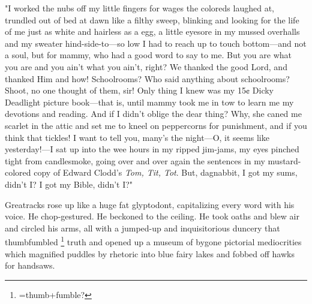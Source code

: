   "I worked the nubs 
off my little fingers for wages the coloreds laughed at, trundled 
out of bed at dawn like a filthy sweep, blinking and looking for the
life of me just as white and hairless as a egg, a little eyesore in my mussed
overhalls and my sweater hind-side-to---so low I had to reach up to touch
bottom---and not a soul, but for mammy, who had a good word to say to me. But you
are what you are and you ain't what you ain't, right? We thanked the good Lord,
and thanked Him and how! Schoolrooms? Who said anything about schoolrooms?
Shoot, no one thought of them, sir! Only thing I knew was my 15¢ Dicky Deadlight
picture book---that is, until mammy took me in tow to learn me my devotions and
reading. And if I didn't oblige the dear thing? Why, she caned me scarlet in the
attic and set me to kneel on peppercorns for punishment, and if you think that
tickles! 
I want to tell you, many's the night---O, it seems like yesterday!---I sat
up into the wee hours in my ripped jim-jams, 
my eyes pinched tight from
candlesmoke, going over and over again the sentences in my mustard-colored copy
of Edward Clodd's \textit{Tom, Tit, Tot}. But, dagnabbit, 
I got my sums, didn't I? I got my Bible, didn't I?"
 
  Greatracks rose up like a huge fat glyptodont, 
capitalizing every word with
his voice. He chop-gestured. He beckoned 
to the ceiling. He took oaths and blew
air and circled his arms, all with a jumped-up and inquisitorious duncery 
that thumbfumbled 
\footnote{ =thumb+fumble? }
truth and opened up a museum of bygone pictorial mediocrities which
magnified puddles 
by rhetoric into blue fairy lakes and fobbed 
off hawks for handsaws.
 
